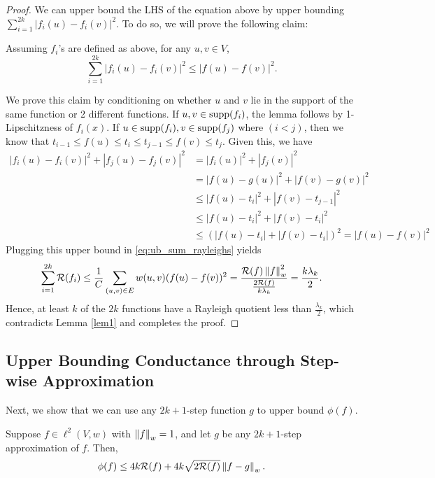 \documentclass[11pt]{article}
\begin{document}
\begin{proof}
We can upper bound the LHS of the equation above by upper bounding $\sum_{i=1}^{2k} |f_i(u) - f_i(v)|^2$. To do so, we will prove the following claim:
\begin{lemma}
    Assuming $f_i$'s are defined as above, for any $u,v \in V$,
    \begin{equation}
        \sum_{i=1}^{2k} |f_i(u) - f_i(v)|^2 \leq |f(u) - f(v)|^2.
    \end{equation}
\end{lemma}

We prove this claim by conditioning on whether $u$ and $v$ lie in the support of the same function or 2 different functions. If $u, v \in \mathrm{supp}({f_i})$, the lemma follows by 1-Lipschitzness of $f_i(x)$. If $u \in \mathrm{supp}({f_i}), v \in \mathrm{supp}({f_j})$ where $(i < j)$, then we know that $t_{i-1} \leq f(u) \leq t_i \leq t_{j-1} \leq f(v) \leq t_j$. Given this, we have
\begin{align*}
    |f_i(u) - f_i(v)|^2 + |f_j(u) - f_j(v)|^2 &= |f_i(u)|^2 + |f_j(v)|^2 \\
    &= |f(u) - g(u)|^2 + |f(v) - g(v)|^2 \\
    &\leq |f(u) - t_i|^2 + |f(v) - t_{j-1}|^2 \\
    &\leq |f(u) - t_i|^2 + |f(v) - t_i|^2 \\
    &\leq (|f(u) - t_i| + |f(v) - t_i|)^2 = |f(u) - f(v)|^2
\end{align*}
Plugging this upper bound in \eqref{eq:ub_sum_rayleighs} yields
\begin{equation*}
    \sum_{i=1}^{2k} \mathcal{R}(f_i) \leq \frac{1}{C} \sum_{(u, v) \in E} w(u, v) (f(u) - f(v))^2 = \frac{\mathcal{R}(f) \left\lVert f \right\rVert_w^2}{\frac{2\mathcal{R}(f)}{k\lambda_k}} = \frac{k \lambda_k}{2}.
\end{equation*}
Hence, at least $k$ of the $2k$ functions have a Rayleigh quotient less than $\frac{\lambda_k}{2}$, which contradicts Lemma \ref{lem1} and completes the proof.
\end{proof}

\subsection{Upper Bounding Conductance through Step-wise Approximation}
Next, we show that we can use any $2k+1$-step function $g$ to upper bound $\phi(f)$.

\begin{proposition}\label{prop:phi_f}
    Suppose $f \in \ell^2(V,w)$ with $\left\lVert f \right\rVert_w = 1$, and let $g$ be any $2k+1$-step approximation of $f$. Then,
    \begin{equation}
        \phi(f) \leq 4k\mathcal{R}(f) + 4k\sqrt{2\mathcal{R}(f)}\left\lVert f-g \right\rVert_w.
    \end{equation}
\end{proposition}
\end{document}
